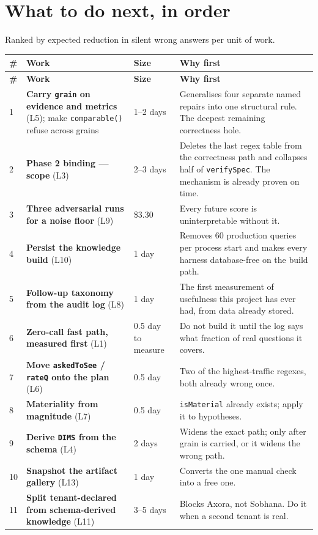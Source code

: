 \documentclass[11pt,a4paper]{report}
\newcommand{\code}[1]{\texttt{\small #1}}
\begin{document}
\section{What to do next, in order}

Ranked by expected reduction in silent wrong answers per unit of work.

\begin{center}
\small
\begin{longtable}{@{}p{0.7cm}p{6.0cm}p{2.0cm}p{5.4cm}@{}}
\toprule
\textbf{\#} & \textbf{Work} & \textbf{Size} & \textbf{Why first}\\
\midrule
\endfirsthead
\toprule
\textbf{\#} & \textbf{Work} & \textbf{Size} & \textbf{Why first}\\
\midrule
\endhead
1 & \textbf{Carry \code{grain} on evidence and metrics} (L5); make \code{comparable()} refuse across
 grains & 1--2 days & Generalises four separate named repairs into one structural rule. The deepest
 remaining correctness hole.\\
2 & \textbf{Phase 2 binding --- scope} (L3) & 2--3 days & Deletes the last regex table from the
 correctness path and collapses half of \code{verifySpec}. The mechanism is already proven on time.\\
3 & \textbf{Three adversarial runs for a noise floor} (L9) & \$3.30 & Every future score is
 uninterpretable without it.\\
4 & \textbf{Persist the knowledge build} (L10) & 1 day & Removes 60 production queries per process
 start and makes every harness database-free on the build path.\\
5 & \textbf{Follow-up taxonomy from the audit log} (L8) & 1 day & The first measurement of
 usefulness this project has ever had, from data already stored.\\
6 & \textbf{Zero-call fast path, measured first} (L1) & 0.5 day to measure & Do not build it until
 the log says what fraction of real questions it covers.\\
7 & \textbf{Move \code{askedToSee} / \code{rateQ} onto the plan} (L6) & 0.5 day & Two of the
 highest-traffic regexes, both already wrong once.\\
8 & \textbf{Materiality from magnitude} (L7) & 0.5 day & \code{isMaterial} already exists; apply it
 to hypotheses.\\
9 & \textbf{Derive \code{DIMS} from the schema} (L4) & 2 days & Widens the exact path; only after
 grain is carried, or it widens the wrong path.\\
10 & \textbf{Snapshot the artifact gallery} (L13) & 1 day & Converts the one manual check into a
 free one.\\
11 & \textbf{Split tenant-declared from schema-derived knowledge} (L11) & 3--5 days & Blocks Axora,
 not Sobhana. Do it when a second tenant is real.\\
\bottomrule
\end{longtable}
\end{center}
\end{document}
